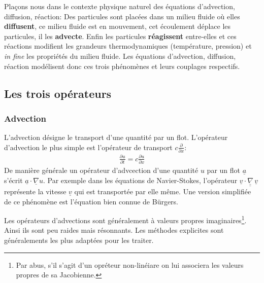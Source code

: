 Plaçons nous dans le contexte physique naturel des équations d'advection, diffusion, réaction:
Des particules sont placées dans un milieu fluide où elles \textbf{diffusent}, ce milieu fluide
est en mouvement, cet écoulement déplace les particules, il les \textbf{advecte}.
Enfin les particules \textbf{réagissent} entre-elles et ces réactions modifient les grandeurs thermodynamiques (température, pression) et \textit{in fine} les propriétés
du milieu fluide.
Les équations d'advection, diffusion, réaction modélisent donc ces trois phénomènes et leurs couplages respectifs.

\subsection{Les trois opérateurs}
\subsubsection{Advection}
    L'advection désigne le transport d'une quantité par un flot. L'opérateur d'advection le plus simple est l'opérateur
    de transport $c \frac{\partial}{\partial x}$:
    \begin{align}\frac{\partial u}{\partial t} = c \frac{\partial u}{\partial x}\end{align}
    De manière générale un opérateur d'advcection d'une quantité $u$ par un flot $\underline a$ s'écrit $\underline a \cdot \underline{\nabla} u$.
    Par exemple dans les équations de Navier-Stokes, l'opérateur $\underline{v} \cdot \underline{\underline \nabla} \, \underline{v}$ représente 
    la vitesse $\underline v$ qui est transportée par elle même. Une version simplifiée de ce phénomène est l'équation bien connue de Bürgers.\par 
    Les opérateurs d'advections sont généralement à valeurs propres imaginaires\footnote{Par abus, s'il s'agit d'un opréteur non-linéiare on lui associera les valeurs propres de sa Jacobienne.}.
    Ainsi ils sont peu raides mais résonnants. Les méthodes explicites sont généralements les plus adaptées pour les traiter.

